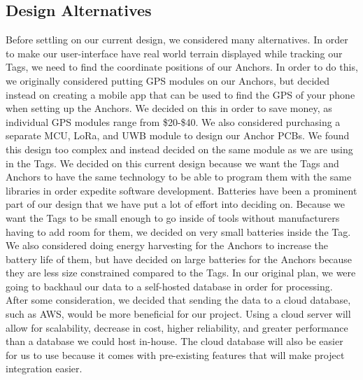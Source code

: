 \documentclass[conference]{IEEEtran}
\begin{document}
\subsection{Design Alternatives}
Before settling on our current design, we considered many alternatives. 
In order to make our user-interface have real world terrain displayed 
while tracking our Tags, we need to find the coordinate positions of our 
Anchors. In order to do this, we originally considered putting GPS 
modules on our Anchors, but decided instead on creating a mobile app 
that can be used to find the GPS of your phone when setting up the 
Anchors. We decided on this in order to save money, as individual GPS 
modules range from \$20-\$40. We also considered purchasing a separate 
MCU, LoRa, and UWB module to design our Anchor PCBs. We found this 
design too complex and instead decided on the same module as we are 
using in the Tags. We decided on this current design because we want 
the Tags and Anchors to have the same technology to be able to program 
them with the same libraries in order expedite software development. 
Batteries have been a prominent part of our design that we have put a 
lot of effort into deciding on. Because we want the Tags to be small 
enough to go inside of tools without manufacturers having to add room 
for them, we decided on very small batteries inside the Tag. We also 
considered doing energy harvesting for the Anchors to increase the 
battery life of them, but have decided on large batteries for the 
Anchors because they are less size constrained compared to the Tags. 
In our original plan, we were going to backhaul our data to a 
self-hosted database in order for processing. After some consideration, 
we decided that sending the data to a cloud database, such as AWS, 
would be more beneficial for our project. Using a cloud server will 
allow for scalability, decrease in cost, higher reliability, and 
greater performance than a database we could host in-house. The cloud 
database will also be easier for us to use because it comes with 
pre-existing features that will make project integration easier.
\end{document}
